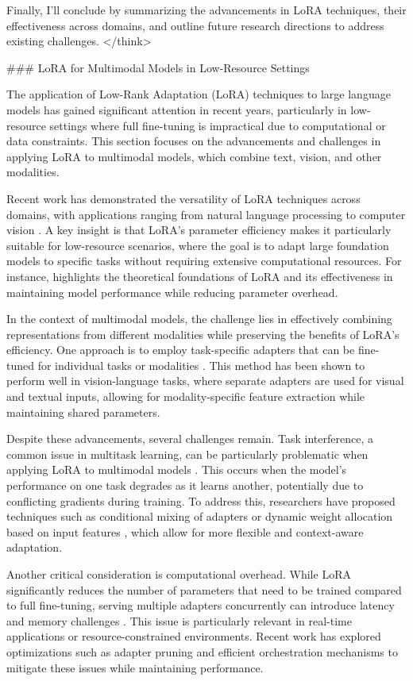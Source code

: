 \documentclass[conference]{IEEEtran}
\begin{document}
Finally, I'll conclude by summarizing the advancements in LoRA techniques, their effectiveness across domains, and outline future research directions to address existing challenges.
</think>

### LoRA for Multimodal Models in Low-Resource Settings

The application of Low-Rank Adaptation (LoRA) techniques to large language models has gained significant attention in recent years, particularly in low-resource settings where full fine-tuning is impractical due to computational or data constraints. This section focuses on the advancements and challenges in applying LoRA to multimodal models, which combine text, vision, and other modalities.

Recent work has demonstrated the versatility of LoRA techniques across domains, with applications ranging from natural language processing to computer vision \cite{bX}. A key insight is that LoRA's parameter efficiency makes it particularly suitable for low-resource scenarios, where the goal is to adapt large foundation models to specific tasks without requiring extensive computational resources. For instance, \cite{bX} highlights the theoretical foundations of LoRA and its effectiveness in maintaining model performance while reducing parameter overhead.

In the context of multimodal models, the challenge lies in effectively combining representations from different modalities while preserving the benefits of LoRA's efficiency. One approach is to employ task-specific adapters that can be fine-tuned for individual tasks or modalities \cite{bX}. This method has been shown to perform well in vision-language tasks, where separate adapters are used for visual and textual inputs, allowing for modality-specific feature extraction while maintaining shared parameters.

Despite these advancements, several challenges remain. Task interference, a common issue in multitask learning, can be particularly problematic when applying LoRA to multimodal models \cite{bX}. This occurs when the model's performance on one task degrades as it learns another, potentially due to conflicting gradients during training. To address this, researchers have proposed techniques such as conditional mixing of adapters or dynamic weight allocation based on input features \cite{bX}, which allow for more flexible and context-aware adaptation.

Another critical consideration is computational overhead. While LoRA significantly reduces the number of parameters that need to be trained compared to full fine-tuning, serving multiple adapters concurrently can introduce latency and memory challenges \cite{bX}. This issue is particularly relevant in real-time applications or resource-constrained environments. Recent work has explored optimizations such as adapter pruning and efficient orchestration mechanisms to mitigate these issues while maintaining performance.
\end{document}
